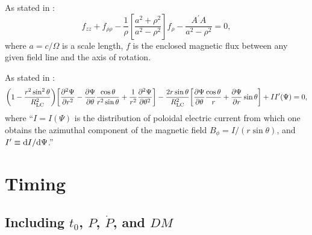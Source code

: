\documentclass{book}
\newcommand{\pd}[2]{\frac{\partial {#1}}{\partial {#2}}}
\newcommand{\ppd}[2]{\frac{\partial^2{#1}}{\partial {#2}^2}}
\begin{document}
As stated in \citet{Michel1982}:
\begin{equation}
    f_{zz} + f_{\rho\rho} - \frac{1}{\rho}\left[\frac{a^2 + \rho^2}{a^2 - \rho^2}\right] f_\rho -
    \frac{A^\prime A}{a^2 - \rho^2} = 0,
\end{equation}
where $a = c/\Omega$ is a scale length, $f$ is the enclosed magnetic flux between any given field line and the axis of rotation.

As stated in \citet{Contopoulos2024}:
\begin{equation}
    \bigg( 1 - \frac{r^2\sin^2\theta}{R_{\rm LC}^2} \bigg)
    \bigg[ \ppd{\Psi}{r} - \pd{\Psi}{\theta} \frac{\cos\theta}{r^2\sin\theta} + \frac{1}{r^2} \ppd{\Psi}{\theta} \bigg] -
    \frac{2r \sin\theta}{R_{\rm LC}^2} \bigg[ \pd{\Psi}{\theta} \frac{\cos\theta}{r} + \pd{\Psi}{r} \sin\theta \bigg] +
    I I^\prime(\Psi) = 0,
\end{equation}
where ``$I = I(\Psi)$ is the distribution of poloidal electric current from which one obtains the azimuthal component of the magnetic field $B_\phi = I/(r \sin\theta)$, and $I^\prime \equiv {\rm d}I/{\rm d}\Psi$.''


\section{Timing}

\subsection{Including $t_0$, $P$, $\dot{P}$, and $DM$}
\end{document}

